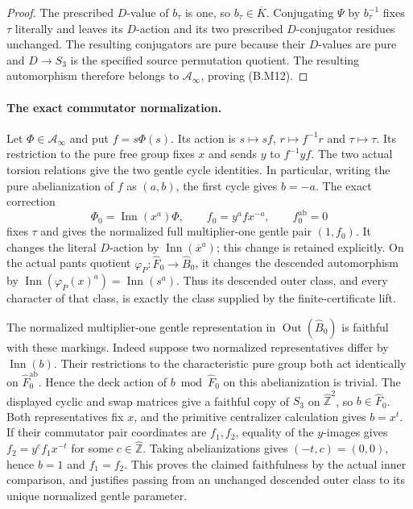 \begin{proof}
The prescribed $D$-value of $b_\tau$ is one, so
$b_\tau\in\overline K$.  Conjugating $\Psi$ by
$b_\tau^{-1}$ fixes $\tau$ literally and leaves its
$D$-action and its two prescribed $D$-conjugator
residues unchanged.  The resulting conjugators are
pure because their $D$-values are pure and $D\to S_3$
is the specified source permutation quotient.  The
resulting automorphism therefore belongs to
$\mathcal A_{\infty}$, proving (B.M12).
\end{proof}

\paragraph{The exact commutator normalization.}
Let $\Phi\in\mathcal A_{\infty}$ and put $f=s\Phi(s)$.
Its action is $s\mapsto sf$, $r\mapsto f^{-1}r$ and
$\tau\mapsto\tau$.  Its restriction to the pure free
group fixes $x$ and sends $y$ to $f^{-1}yf$.
The two actual torsion relations give the two gentle
cycle identities.  In particular, writing the pure
abelianization of $f$ as $(a,b)$, the first cycle gives
$b=-a$.  The exact correction
\[
 \Phi_0=\operatorname{Inn}(x^a)\Phi,\qquad
 f_0=y^a f x^{-a},\qquad f_0^{\mathrm{ab}}=0      \tag{B.M13}
\]
fixes $\tau$ and gives the normalized full multiplier-one
gentle pair $(1,f_0)$.  It changes the literal $D$-action
by $\operatorname{Inn}(\overline x^{a})$; this change
is retained explicitly.  On the actual pants quotient
$\varphi_P:\widehat F_0\to\widehat B_0$, it changes
the descended automorphism by
$\operatorname{Inn}(\varphi_P(x)^a)
=\operatorname{Inn}(s^a)$.  Thus its descended outer
class, and every character of that class, is exactly
the class supplied by the finite-certificate lift.

The normalized multiplier-one gentle representation in
$\operatorname{Out}(\widehat B_0)$ is faithful with
these markings.  Indeed suppose two normalized
representatives differ by $\operatorname{Inn}(b)$.
Their restrictions to the characteristic pure group
both act identically on $\widehat F_0^{\mathrm{ab}}$.
Hence the deck action of $b\bmod\widehat F_0$ on this
abelianization is trivial.  The displayed cyclic and
swap matrices give a faithful copy of $S_3$ on
$\widehat{\mathbb Z}^{2}$, so $b\in\widehat F_0$.
Both representatives fix $x$, and the primitive
centralizer calculation gives $b=x^t$.  If their
commutator pair coordinates are $f_1,f_2$, equality
of the $y$-images gives
$f_2=y^c f_1x^{-t}$ for some $c\in\widehat{\mathbb Z}$.
Taking abelianizations gives $(-t,c)=(0,0)$, hence
$b=1$ and $f_1=f_2$.  This proves the claimed
faithfulness by the actual inner comparison, and
justifies passing from an unchanged descended outer
class to its unique normalized gentle parameter.
